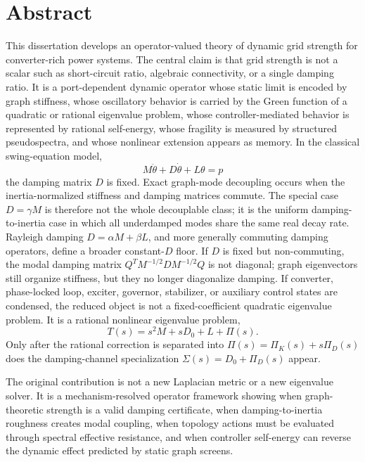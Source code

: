 \documentclass[11pt,letterpaper,oneside]{book}
\begin{document}
\chapter*{Abstract}
This dissertation develops an operator-valued theory of dynamic grid strength
for converter-rich power systems. The central claim is that grid strength is
not a scalar such as short-circuit ratio, algebraic connectivity, or a single
damping ratio. It is a port-dependent dynamic operator whose static limit is
encoded by graph stiffness, whose oscillatory behavior is carried by the Green
function of a quadratic or rational eigenvalue problem, whose
controller-mediated behavior is represented by rational self-energy, whose
fragility is measured by structured pseudospectra, and whose nonlinear
extension appears as memory. In the classical swing-equation model,
\[
  M\ddot\theta+D\dot\theta+L\theta=p
\]
the damping matrix \(D\) is fixed. Exact graph-mode decoupling occurs when the
inertia-normalized stiffness and damping matrices commute. The special case
\(D=\gamma M\) is therefore not the whole decouplable class; it is the uniform
damping-to-inertia case in which all underdamped modes share the same real
decay rate. Rayleigh damping \(D=\alpha M+\beta L\), and more generally
commuting damping operators, define a broader constant-\(D\) floor. If \(D\) is
fixed but non-commuting, the modal damping matrix
\(Q^TM^{-1/2}DM^{-1/2}Q\) is not diagonal; graph eigenvectors still organize
stiffness, but they no longer diagonalize damping. If converter, phase-locked
loop, exciter, governor, stabilizer, or auxiliary control states are condensed,
the reduced object is not a fixed-coefficient quadratic eigenvalue problem. It
is a rational nonlinear eigenvalue problem,
\[
  T(s)=s^2M+sD_0+L+\Pi(s).
\]
Only after the rational correction is separated into
\(\Pi(s)=\Pi_K(s)+s\Pi_D(s)\) does the damping-channel specialization
\(\Sigma(s)=D_0+\Pi_D(s)\) appear.

The original contribution is not a new Laplacian metric or a new eigenvalue
solver. It is a mechanism-resolved operator framework showing when
graph-theoretic strength is a valid damping certificate, when
damping-to-inertia roughness creates modal coupling, when topology actions
must be evaluated through spectral effective resistance, and when controller
self-energy can reverse the dynamic effect predicted by static graph screens.
\end{document}
